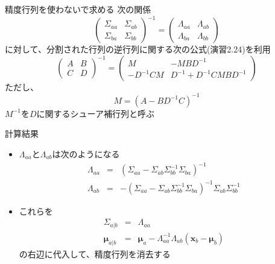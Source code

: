 \begin{frame}{精度行列を使わないで求める}
 次の関係
 \begin{equation}
  \begin{pmatrix}
   \Sigma_{aa} & \Sigma_{ab}  \\
   \Sigma_{ba} & \Sigma_{bb}
  \end{pmatrix}^{-1}=
  \begin{pmatrix}
   \Lambda_{aa} & \Lambda_{ab}  \\
   \Lambda_{ba} & \Lambda_{bb}
  \end{pmatrix}
 \end{equation}
 に対して、分割された行列の逆行列に関する次の公式(演習2.24)を利用
 \begin{equation}
  \begin{pmatrix}
   A & B \\
   C & D
  \end{pmatrix}^{-1}
  =
  \begin{pmatrix}
   M & -MBD^{-1} \\
   -D^{-1}CM & D^{-1}+D^{-1}CMBD^{-1}
  \end{pmatrix}\label{053319_21Nov14}
 \end{equation}
 ただし、
 \begin{equation}
  M=(A-BD^{-1}C)^{-1}
 \end{equation}
 $M^{-1}$を$D$に関するシューア補行列と呼ぶ
\end{frame}

\begin{frame}{計算結果}
 \begin{itemize}
  \item $\Lambda_{aa}$と$\Lambda_{ab}$は次のようになる
        \begin{eqnarray}
         \Lambda_{aa}&=&(\Sigma_{aa}-\Sigma_{ab}\Sigma_{bb}^{-1}\Sigma_{ba})^{-1} \\
         \Lambda_{ab}&= &-(\Sigma_{aa}-\Sigma_{ab}\Sigma_{bb}^{-1}\Sigma_{ba})^{-1} \Sigma_{ab}\Sigma_{bb}^{-1}
        \end{eqnarray}
  \item これらを
        \begin{eqnarray}
         \Sigma_{a|b} &=& \Lambda_{aa} \\
         \bm{\mu}_{a|b}  &= & \bm{\mu}_a - \Lambda_{aa}^{-1}\Lambda_{ab}(\bm{x}_b-\bm{\mu}_b)
        \end{eqnarray}
        の右辺に代入して、精度行列を消去する
 \end{itemize}
\end{frame}

